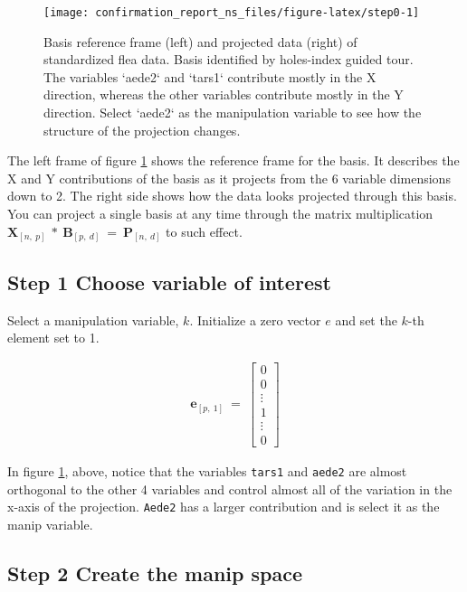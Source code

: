 \documentclass{monashthesis}
\begin{document}
\begin{figure}

{\centering \texttt{[image: confirmation\_report\_ns\_files/figure-latex/step0-1]} 

}

\caption{Basis reference frame (left) and projected data (right) of standardized flea data. Basis identified by holes-index guided tour. The variables `aede2` and `tars1` contribute mostly in the X direction, whereas the other variables contribute mostly in the Y direction. Select `aede2` as the manipulation variable to see how the structure of the projection changes.}\label{fig:step0}
\end{figure}

The left frame of figure \ref{fig:step0} shows the reference frame for
the basis. It describes the X and Y contributions of the basis as it
projects from the 6 variable dimensions down to 2. The right side shows
how the data looks projected through this basis. You can project a
single basis at any time through the matrix multiplication
\(\textbf{X}_{[n,~p]} ~*~ \textbf{B}_{[p,~d]} ~=~ \textbf{P}_{[n,~d]}\)
to such effect.

\subsection{Step 1 Choose variable of
interest}\label{step-1-choose-variable-of-interest}

Select a manipulation variable, \(k\). Initialize a zero vector \(e\)
and set the \(k\)-th element set to 1.

\begin{align*}
\textbf{e}_{[p,~1]} ~=~
  \begin{bmatrix}
    0 \\
    0 \\
    \vdots \\
    1 \\
    \vdots \\
    0
  \end{bmatrix}
\end{align*}

In figure \ref{fig:step0}, above, notice that the variables
\texttt{tars1} and \texttt{aede2} are almost orthogonal to the other 4
variables and control almost all of the variation in the x-axis of the
projection. \texttt{Aede2} has a larger contribution and is select it as
the manip variable.

\subsection{Step 2 Create the manip
space}\label{step-2-create-the-manip-space}
\end{document}
